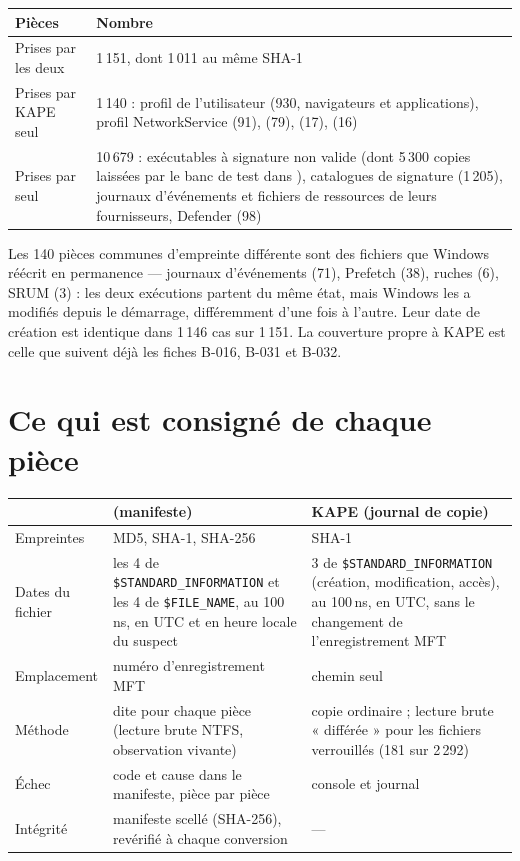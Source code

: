 \documentclass[11pt,a4paper,oneside]{report}
\begin{document}
\begin{longtable}{@{}L{6.4cm}L{8.6cm}@{}}
\toprule
\textbf{Pièces} & \textbf{Nombre} \\
\midrule\endhead
Prises par les deux & 1\,151, dont 1\,011 au même SHA-1 \\
Prises par KAPE seul & 1\,140 : profil de l'utilisateur (930, navigateurs et
  applications), profil NetworkService (91),  (79),
   (17),  (16) \\
Prises par \wac{} seul & 10\,679 : exécutables à signature non valide (dont
  5\,300 copies laissées par le banc de test dans ), catalogues de signature (1\,205), journaux d'événements et
  fichiers de ressources de leurs fournisseurs, Defender (98) \\
\bottomrule
\end{longtable}

Les 140 pièces communes d'empreinte différente sont des fichiers que Windows
réécrit en permanence --- journaux d'événements (71), Prefetch (38), ruches (6),
SRUM (3) : les deux exécutions partent du même état, mais Windows les a modifiés
depuis le démarrage, différemment d'une fois à l'autre. Leur date de création
est identique dans 1\,146 cas sur 1\,151. La couverture propre à KAPE est celle
que suivent déjà les fiches B-016, B-031 et B-032.

\section{Ce qui est consigné de chaque pièce}

\begin{longtable}{@{}L{3.6cm}L{6.0cm}L{5.4cm}@{}}
\toprule
 & \textbf{\wac{} (manifeste)} & \textbf{KAPE (journal de copie)} \\
\midrule\endhead
Empreintes & MD5, SHA-1, SHA-256 & SHA-1 \\
Dates du fichier & les 4 de \texttt{\$STANDARD\_INFORMATION} et les 4 de
  \texttt{\$FILE\_NAME}, au 100\,ns, en UTC et en heure locale du suspect &
  3 de \texttt{\$STANDARD\_INFORMATION} (création, modification, accès), au
  100\,ns, en UTC, sans le changement de l'enregistrement MFT \\
Emplacement & numéro d'enregistrement MFT & chemin seul \\
Méthode & dite pour chaque pièce (lecture brute NTFS, observation vivante) &
  copie ordinaire ; lecture brute « différée » pour les fichiers verrouillés
  (181 sur 2\,292) \\
Échec & code et cause dans le manifeste, pièce par pièce & console et journal \\
Intégrité & manifeste scellé (SHA-256), revérifié à chaque conversion & --- \\
\bottomrule
\end{longtable}
\end{document}
